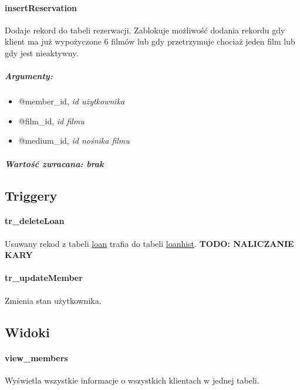 \documentclass[12pt,a4paper,titlepage]{article}
\begin{document}
\paragraph{insertReservation}
Dodaje rekord do tabeli rezerwacji. Zablokuje możliwość dodania rekordu gdy klient ma już wypożyczone 6 filmów lub gdy przetrzymuje chociaż jeden film lub gdy jest nieaktywny.
\subparagraph{Argumenty:}
\begin{itemize}
	\item @member\_id, \textit{id użytkownika}
	\item @film\_id, \textit{id filmu}
	\item @medium\_id, \textit{id nośnika filmu}
\end{itemize}
\subparagraph{Wartość zwracana: brak}




\subsection{Triggery}
\paragraph{tr\_deleteLoan}
Usuwany rekod z tabeli \underline{loan} trafia do tabeli \underline{loanhist}.
\textbf{TODO: NALICZANIE KARY}

\paragraph{tr\_updateMember}
Zmienia stan użytkownika.




\subsection{Widoki}

\paragraph{view\_members}
Wyświetla wszystkie informacje o wszystkich klientach w jednej tabeli.
\end{document}
